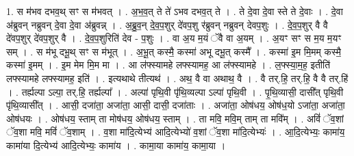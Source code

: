 \documentclass[17pt]{extarticle}
\begin{document}
1. स म॑भव दभव॒थ् सꣳ स म॑भवत् । . अ॒भ॒व॒त् ते ते॑ ऽभव दभव॒त् ते । . ते दे॒वा दे॒वा स्ते ते दे॒वाः । . दे॒वा अ॑ब्रुवन् नब्रुवन् दे॒वा दे॒वा अ॑ब्रुवन्न् । . अ॒ब्रु॒व॒न् दे॒व॒प॒शुर् दे॑वप॒शु र॑ब्रुवन् नब्रुवन् देवप॒शुः । . दे॒व॒प॒शुर् वै वै दे॑वप॒शुर् दे॑वप॒शुर् वै । . दे॒व॒प॒शुरिति॑ देव - प॒शुः । . वा अ॒य म॒यं ॅवै वा अ॒यम् । . अ॒यꣳ सꣳ स म॒य म॒यꣳ सम् । . स म॑भू दभू॒थ् सꣳ स म॑भूत् । . अ॒भू॒त् कस्मै॒ कस्मा॑ अभू दभू॒त् कस्मै᳚ । . कस्मा॑ इ॒म मि॒मम् कस्मै॒ कस्मा॑ इ॒मम् । . इ॒म मेम मि॒म मा । . आ ल॑फ्स्यामहे लफ्स्यामह॒ आ ल॑फ्स्यामहे । . ल॒फ्स्या॒म॒ह॒ इतीति॑ लफ्स्यामहे लफ्स्यामह॒ इति॑ । . इत्यथाथे तीत्यथ॑ । . अथ॒ वै वा अथाथ॒ वै । . वै तर्.हि॒ तर्.हि॒ वै वै तर्.हि॑ । . तर्ह्यल्पा ऽल्पा॒ तर्.हि॒ तर्ह्यल्पा᳚ । . अल्पा॑ पृथि॒वी पृ॑थि॒व्यल्पा ऽल्पा॑ पृथि॒वी । . पृ॒थि॒व्यासी॒ दासी᳚त् पृथि॒वी पृ॑थि॒व्यासी᳚त् । . आसी॒ दजा॑ता॒ अजा॑ता॒ आसी॒ दासी॒ दजा॑ताः । . अजा॑ता॒ ओष॑धय॒ ओष॑ध॒यो ऽजा॑ता॒ अजा॑ता॒ ओष॑धयः । . ओष॑धय॒ स्ताम् ता मोष॑धय॒ ओष॑धय॒ स्ताम् । . ता मवि॒ मवि॒म् ताम् ता मवि᳚म् । . अविं॑ ॅव॒शां ॅव॒शा मवि॒ मविं॑ ॅव॒शाम् । . व॒शा मा॑दि॒त्येभ्य॑ आदि॒त्येभ्यो॑ व॒शां ॅव॒शा मा॑दि॒त्येभ्यः॑ । . आ॒दि॒त्येभ्यः॒ कामा॑य॒ कामा॑या दि॒त्येभ्य॑ आदि॒त्येभ्यः॒ कामा॑य । . कामा॒या कामा॑य॒ कामा॒या । \newline
\end{document}
